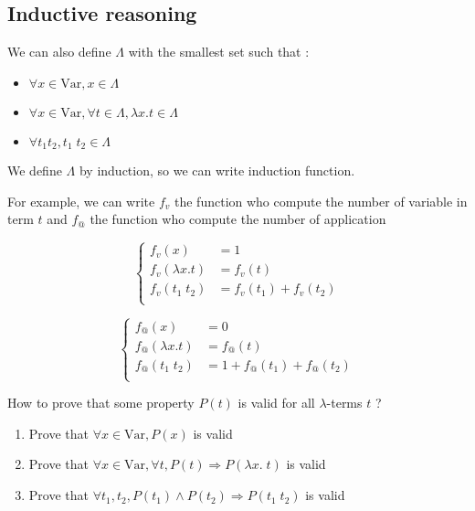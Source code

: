   \subsection{Inductive reasoning}

  We can also define $\Lambda$ with the smallest set such that :

  \begin{itemize}
    \item $\forall x \in \text{Var}, x \in \Lambda$
    \item $\forall x \in \text{Var}, \forall t \in \Lambda, \lambda x.t \in
      \Lambda$
    \item $\forall t_1 t_2, t_1\; t_2 \in \Lambda$
  \end{itemize}

  We define $\Lambda$ by induction, so we can write induction function.

  For example, we can write $f_v$ the function who compute the number of
  variable in term $t$ and $f_@$ the function who compute the number of
  application
  \begin{multicols}{2}
    \[
        \begin{cases}
            f_v(x) &= 1 \\
            f_v(\lambda x. t) &= f_v(t) \\
            f_v(t_1\; t_2) &= f_v(t_1) + f_v(t_2) \\
        \end{cases}
    \]

    \[
        \begin{cases}
            f_@(x) &= 0 \\
            f_@(\lambda x. t) &= f_@(t) \\
            f_@(t_1\; t_2) &= 1 + f_@(t_1) + f_@(t_2) \\
        \end{cases}
    \]
  \end{multicols}

  How to prove that some property $P(t)$ is valid for all $\lambda$-terms $t$ ?

  \begin{enumerate}
    \item Prove that $\forall x \in \text{Var}, P(x)$ is valid
    \item Prove that $\forall x \in \text{Var}, \forall t, P(t) \Rightarrow
      P(\lambda x.\; t)$ is valid
    \item Prove that $\forall t_1, t_2, P(t_1) \wedge P(t_2) \Rightarrow P(t_1
      \; t_2)$ is valid
  \end{enumerate}

